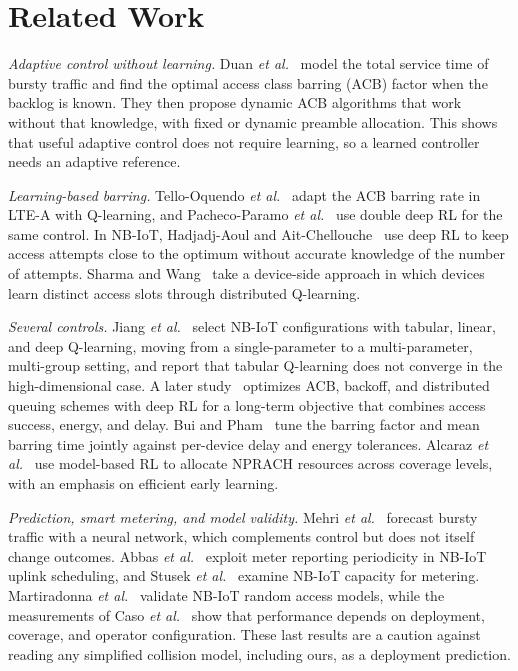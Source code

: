 \documentclass[conference]{IEEEtran}
\begin{document}
\section{Related Work}
\label{sec:related}
\emph{Adaptive control without learning.} Duan \emph{et al.}~\cite{duan} model the
total service time of bursty traffic and find the optimal access class barring (ACB)
factor when the backlog is known. They then propose dynamic ACB algorithms that work
without that knowledge, with fixed or dynamic preamble allocation. This shows that
useful adaptive control does not require learning, so a learned controller needs an
adaptive reference.

\emph{Learning-based barring.} Tello-Oquendo \emph{et al.}~\cite{tello} adapt the
ACB barring rate in LTE-A with Q-learning, and Pacheco-Paramo
\emph{et al.}~\cite{pacheco} use double deep RL for the same control. In NB-IoT,
Hadjadj-Aoul and Ait-Chellouche~\cite{hadjadj} use deep RL to keep access attempts
close to the optimum without accurate knowledge of the number of attempts. Sharma
and Wang~\cite{sharma} take a device-side approach in which devices learn distinct
access slots through distributed Q-learning.

\emph{Several controls.} Jiang \emph{et al.}~\cite{jiang19} select NB-IoT
configurations with tabular, linear, and deep Q-learning, moving from a
single-parameter to a multi-parameter, multi-group setting, and report that
tabular Q-learning does not converge in the high-dimensional case. A later
study~\cite{jiang21} optimizes ACB, backoff, and distributed queuing schemes with
deep RL for a long-term objective that combines access success, energy, and
delay. Bui and Pham~\cite{bui} tune the barring factor and mean barring time
jointly against per-device delay and energy tolerances. Alcaraz
\emph{et al.}~\cite{alcaraz} use model-based RL to allocate NPRACH resources
across coverage levels, with an emphasis on efficient early learning.

\emph{Prediction, smart metering, and model validity.} Mehri
\emph{et al.}~\cite{mehri} forecast bursty traffic with a neural network, which
complements control but does not itself change outcomes. Abbas
\emph{et al.}~\cite{abbas} exploit meter reporting periodicity in NB-IoT uplink
scheduling, and Stusek \emph{et al.}~\cite{stusek} examine NB-IoT capacity for
metering. Martiradonna \emph{et al.}~\cite{martiradonna} validate NB-IoT random
access models, while the measurements of Caso \emph{et al.}~\cite{caso} show that
performance depends on deployment, coverage, and operator configuration. These
last results are a caution against reading any simplified collision model,
including ours, as a deployment prediction.
\end{document}
